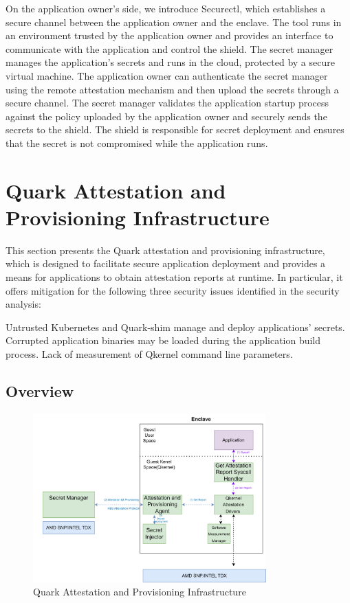 On the application owner's side, we introduce Securectl, which establishes a secure channel between the application owner and the enclave. The tool runs in an environment trusted by the application owner and provides an interface to communicate 
with the application and control the shield. The secret manager manages the application's secrets and runs in the cloud, protected by a secure virtual machine. The application owner can authenticate the secret manager using the remote attestation 
mechanism and then upload the secrets through a secure channel. The secret manager validates the application startup process against the policy uploaded by the application owner and securely sends the secrets to the shield. The shield is responsible 
for secret deployment and ensures that the secret is not compromised while the application runs.

\section{Quark Attestation and Provisioning Infrastructure}
This section presents the Quark attestation and provisioning infrastructure, which is designed to facilitate secure application deployment and provides a means for applications to obtain attestation reports at runtime. In particular, it offers mitigation for the following three security issues identified in the security analysis:

Untrusted Kubernetes and Quark-shim manage and deploy applications' secrets.
Corrupted application binaries may be loaded during the application build process.
Lack of measurement of Qkernel command line parameters.

\subsection{Overview}
\begin{figure}[H]
    \centering
    \includegraphics[width=0.8\textwidth]{images/Qkernel_attestation_infrastructurc.png}
    \caption[Quark Attestation and Provisioning Infrastructure]{Quark Attestation and Provisioning Infrastructure}
    \label{fig:Qkernel_attestation_infrastructurc}
\end{figure}

